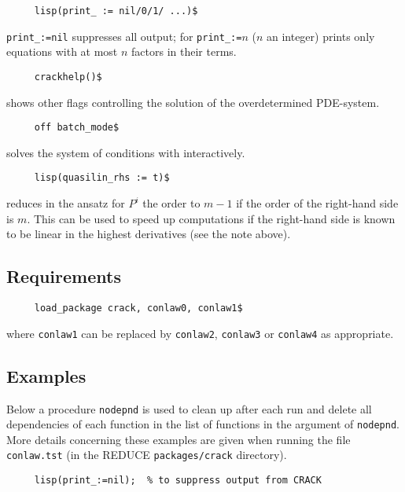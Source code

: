 \begin{verbatim}
     lisp(print_ := nil/0/1/ ...)$
\end{verbatim}
\texttt{print\_:=nil} suppresses all  output; for
\texttt{print\_:=}$n$ ($n$ an integer)  prints only
equations with at most $n$ factors in their terms.

\begin{verbatim}
     crackhelp()$
\end{verbatim}
shows other flags controlling the solution of the overdetermined
PDE-system.

\begin{verbatim}
     off batch_mode$
\end{verbatim}
solves the system of conditions with  interactively.

\begin{verbatim}
     lisp(quasilin_rhs := t)$
\end{verbatim}
reduces in the ansatz for $P^i$ the order to $m-1$ if the order of the
right-hand side is $m$.  This can be used to speed up computations if
the right-hand side is known to be linear in the highest derivatives
(see the note above).

\subsection{Requirements}

\begin{verbatim}
     load_package crack, conlaw0, conlaw1$
\end{verbatim}
where \texttt{conlaw1} can be replaced by \texttt{conlaw2},
\texttt{conlaw3} or \texttt{conlaw4} as appropriate.

\subsection{Examples}

Below a  procedure \texttt{nodepnd} is used to clean up
after each run and delete all dependencies of each function in the
list of functions in the argument of \texttt{nodepnd}.  More details
concerning these examples are given when running the file
\texttt{conlaw.tst} (in the REDUCE \texttt{packages/crack} directory).

\begin{verbatim}
     lisp(print_:=nil);  % to suppress output from CRACK
\end{verbatim}

